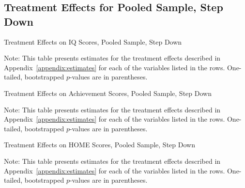 \subsection{Treatment Effects for Pooled Sample, Step Down}


	\begin{table}[H]
     \caption{Treatment Effects on IQ Scores, Pooled Sample, Step Down}
     \label{table:abccare_rslt_pooled_cat0_sd}
	
	\end{table}
\begin{spacing}{1}
\begin{footnotesize}
\noindent Note: This table presents estimates for the treatment effects described in Appendix~\ref{appendix:estimates} for each of the variables listed in the rows.  One-tailed, bootstrapped $p$-values are in parentheses.
\end{footnotesize}
\end{spacing}

	\begin{table}[H]
     \caption{Treatment Effects on Achievement Scores, Pooled Sample, Step Down}
     \label{table:abccare_rslt_pooled_cat1_sd}
	
	\end{table} 
\begin{spacing}{1}
\begin{footnotesize}
\noindent Note: This table presents estimates for the treatment effects described in Appendix~\ref{appendix:estimates} for each of the variables listed in the rows.  One-tailed, bootstrapped $p$-values are in parentheses.
\end{footnotesize}
\end{spacing}

	\begin{table}[H]
     \caption{Treatment Effects on HOME Scores, Pooled Sample, Step Down}
     \label{table:abccare_rslt_pooled_cat2_sd}
	
	\end{table} 
\begin{spacing}{1}
\begin{footnotesize}
\noindent Note: This table presents estimates for the treatment effects described in Appendix~\ref{appendix:estimates} for each of the variables listed in the rows.  One-tailed, bootstrapped $p$-values are in parentheses.
\end{footnotesize}
\end{spacing}

